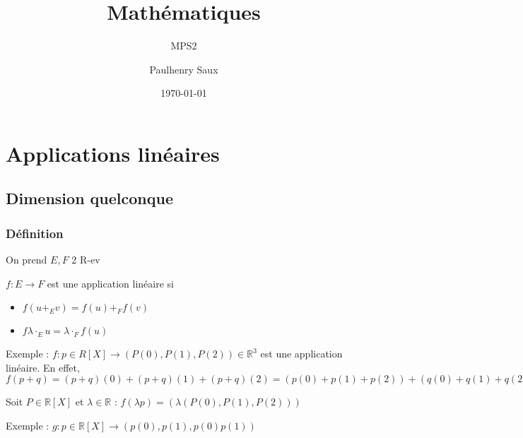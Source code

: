 \documentclass[french]{yLectureNote}
\title{Mathématiques}
\subtitle{MPS2}
\author{Paulhenry Saux}
\date{\today}
\newcommand{\R}[0]{\mathbb{R}}
\begin{document}
\setcounter{chapter}{4}
	\chapter{Applications linéaires}
\section{Dimension quelconque}
\subsection{Définition}
On prend $E,F$ 2 R-ev
\begin{definition}
\(f:E\to F\) est une application linéaire si
\begin{itemize}
 \item \(f(u+_Ev) = f(u)+_Ff(v)\)
 \item \(f\lambda \cdot_E u = \lambda \cdot_F f(u)\)
\end{itemize}
\end{definition}
Exemple : \(f:p\in R[X]\to (P(0),P(1),P(2))\in \R^3\) est une application linéaire. En effet, \(f(p+q) = (p+q)(0)+(p+q)(1)+(p+q)(2)= (p(0)+p(1)+p(2))+(q(0)+q(1)+q(2)) = f(p)+f(q)\)

Soit $P \in \R[X]$ et $\lambda \in \R$ : $f(\lambda p) = (\lambda (P(0),P(1),P(2)))$

Exemple : $g : p\in\R[X]\to (p(0),p(1),p(0)p(1))$
\end{document}
